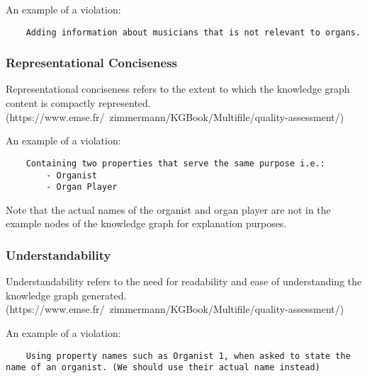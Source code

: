 An example of a violation: 
\begin{lstlisting}
    Adding information about musicians that is not relevant to organs.
\end{lstlisting}

\subsubsection{Representational Conciseness}
\hspace{0.5cm} Representational conciseness refers to the extent to which the knowledge graph content is compactly represented.  \\
(https://www.emse.fr/~zimmermann/KGBook/Multifile/quality-assessment/)

An example of a violation: 
\begin{lstlisting}
    Containing two properties that serve the same purpose i.e.:
        - Organist
        - Organ Player
\end{lstlisting}
\begin{center}
\end{center}

Note that the actual names of the organist and organ player are not in the example nodes of the knowledge graph for explanation purposes. 

\subsubsection{Understandability}
\hspace{0.5cm} Understandability refers to the need for readability and ease of understanding the knowledge graph generated.  
\\(https://www.emse.fr/~zimmermann/KGBook/Multifile/quality-assessment/)

An example of a violation: 
\begin{lstlisting}
    Using property names such as Organist 1, when asked to state the name of an organist. (We should use their actual name instead)
\end{lstlisting}
\begin{center}
\end{center}
